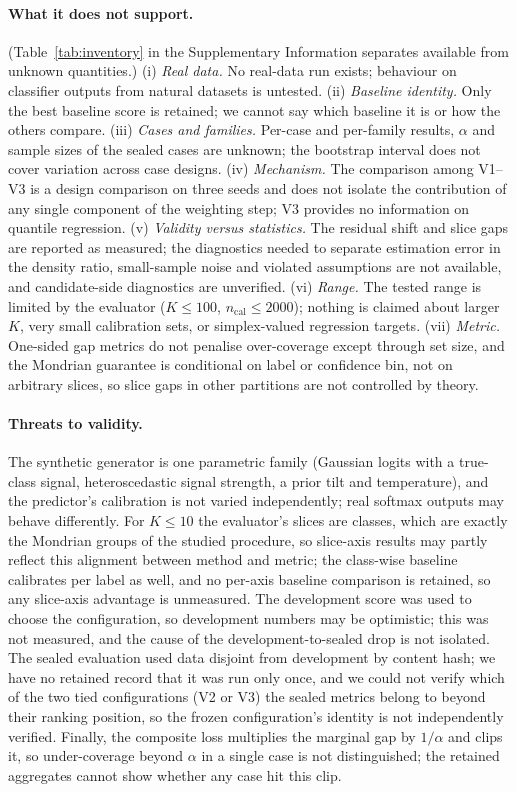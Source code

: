 \documentclass{article}
\begin{document}
\paragraph{What it does not support.} (Table~\ref{tab:inventory} in the Supplementary Information separates available from unknown quantities.)
(i) \emph{Real data.} No real-data run exists; behaviour on classifier outputs from natural datasets is untested.
(ii) \emph{Baseline identity.} Only the best baseline score is retained; we cannot say which baseline it is or how the others compare.
(iii) \emph{Cases and families.} Per-case and per-family results, $\alpha$ and sample sizes of the sealed cases are unknown; the bootstrap interval does not cover variation across case designs.
(iv) \emph{Mechanism.} The comparison among V1--V3 is a design comparison on three seeds and does not isolate the contribution of any single component of the weighting step; V3 provides no information on quantile regression.
(v) \emph{Validity versus statistics.} The residual shift and slice gaps are reported as measured; the diagnostics needed to separate estimation error in the density ratio, small-sample noise and violated assumptions are not available, and candidate-side diagnostics are unverified.
(vi) \emph{Range.} The tested range is limited by the evaluator ($K\le100$, $n_{\mathrm{cal}}\le2000$); nothing is claimed about larger $K$, very small calibration sets, or simplex-valued regression targets.
(vii) \emph{Metric.} One-sided gap metrics do not penalise over-coverage except through set size, and the Mondrian guarantee is conditional on label or confidence bin, not on arbitrary slices, so slice gaps in other partitions are not controlled by theory.

\paragraph{Threats to validity.}
The synthetic generator is one parametric family (Gaussian logits with a true-class signal, heteroscedastic signal strength, a prior tilt and temperature), and the predictor's calibration is not varied independently; real softmax outputs may behave differently. For $K\le10$ the evaluator's slices are classes, which are exactly the Mondrian groups of the studied procedure, so slice-axis results may partly reflect this alignment between method and metric; the class-wise baseline calibrates per label as well, and no per-axis baseline comparison is retained, so any slice-axis advantage is unmeasured. The development score was used to choose the configuration, so development numbers may be optimistic; this was not measured, and the cause of the development-to-sealed drop is not isolated. The sealed evaluation used data disjoint from development by content hash; we have no retained record that it was run only once, and we could not verify which of the two tied configurations (V2 or V3) the sealed metrics belong to beyond their ranking position, so the frozen configuration's identity is not independently verified. Finally, the composite loss multiplies the marginal gap by $1/\alpha$ and clips it, so under-coverage beyond $\alpha$ in a single case is not distinguished; the retained aggregates cannot show whether any case hit this clip.
\end{document}
